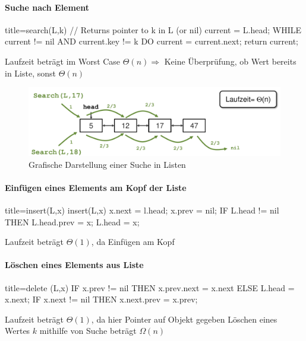 \documentclass[
    ngerman,
    color=3b,
    load_common, %
    summary,
    boxarc,
]{tuda_summary}
\begin{document}
\paragraph{Suche nach Element}\mbox{}
\begin{codeBlock}[autogobble]{title={search(L,k) // Returns pointer to k in L (or nil)}}
    current = L.head;
    WHILE current != nil AND current.key != k DO
      current = current.next;
    return current;
\end{codeBlock}
Laufzeit beträgt im Worst Case $\Theta(n)\Rightarrow$ Keine Überprüfung, ob Wert bereits in Liste, sonst $\Theta(n)$
\begin{figure}[h]
    \centering
    \includegraphics[width=12cm]{pictures/verketteteListenSuche.pdf}
    \caption{Grafische Darstellung einer Suche in Listen}
\end{figure}
\FloatBarrier
\vspace{-1cm}
\begin{minipage}[t]{.49\textwidth}\mbox{}
    \paragraph{Einfügen eines Elements am Kopf der Liste}\mbox{}
        \begin{codeBlock}[autogobble]{title={insert(L,x)}}
            insert(L,x)
            x.next = l.head;
            x.prev = nil;
            IF L.head != nil THEN
                L.head.prev = x;
            L.head = x;
        \end{codeBlock}
    Laufzeit beträgt $\Theta(1)$, da Einfügen am Kopf
\end{minipage}
\begin{minipage}[t]{.5\textwidth}\mbox{}
    \paragraph{Löschen eines Elements aus Liste}\mbox{}
    \begin{codeBlock}[autogobble]{title={delete (L,x)}}
        IF x.prev != nil THEN
          x.prev.next = x.next
        ELSE
          L.head = x.next;
        IF x.next != nil THEN
          x.next.prev = x.prev;
    \end{codeBlock}
    Laufzeit beträgt $\Theta(1)$, da hier Pointer auf Objekt gegeben
    Löschen eines Wertes $k$ mithilfe von Suche beträgt $\Omega(n)$
\end{minipage}
\end{document}
